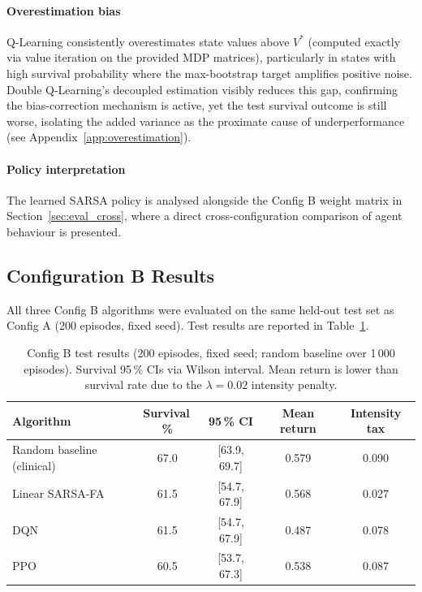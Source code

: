 \documentclass[11pt,a4paper]{article}
\begin{document}
\paragraph{Overestimation bias}
Q-Learning consistently overestimates state values above $V^*$ (computed
exactly via value iteration on the provided MDP matrices), particularly in
states with high survival probability where the max-bootstrap target amplifies
positive noise. Double Q-Learning's decoupled estimation visibly reduces this
gap, confirming the bias-correction mechanism is active, yet the test survival
outcome is still worse, isolating the added variance as the proximate cause of
underperformance (see Appendix~\ref{app:overestimation}).

\paragraph{Policy interpretation}
The learned SARSA policy is analysed alongside the Config B weight matrix in
Section~\ref{sec:eval_cross}, where a direct cross-configuration comparison
of agent behaviour is presented.

\subsection{Configuration B Results}
\label{sec:eval_b}

All three Config B algorithms were evaluated on the same held-out test set
as Config A (200 episodes, fixed seed). Test results are reported in
Table~\ref{tab:results_b}.

\begin{table}[H]
\centering\small
\caption{Config B test results (200 episodes, fixed seed; random baseline over
         1\,000 episodes). Survival 95\,\% CIs via Wilson interval. Mean return
         is lower than survival rate due to the $\lambda=0.02$ intensity penalty.}
\label{tab:results_b}
\begin{tabular}{lcccc}
\toprule
Algorithm & Survival\,\% & 95\,\% CI & Mean return & Intensity tax \\
\midrule
Random baseline (clinical) & 67.0 & [63.9, 69.7] & 0.579 & 0.090 \\
Linear SARSA-FA            & 61.5 & [54.7, 67.9] & 0.568 & 0.027 \\
DQN                        & 61.5 & [54.7, 67.9] & 0.487 & 0.078 \\
PPO                        & 60.5 & [53.7, 67.3] & 0.538 & 0.087 \\
\bottomrule
\end{tabular}
\end{table}
\end{document}
